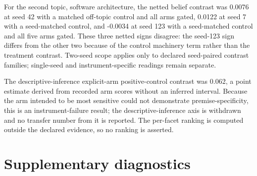 \documentclass[10pt]{article}
\begin{document}
For the second topic, software architecture, the netted belief contrast was 0.0076 at seed 42 with a matched off-topic control and all arms gated, 0.0122 at seed 7 with a seed-matched control, and -0.0034 at seed 123 with a seed-matched control and all five arms gated. These three netted signs disagree: the seed-123 sign differs from the other two because of the control machinery term rather than the treatment contrast. Two-seed scope applies only to declared seed-paired contrast families; single-seed and instrument-specific readings remain separate.



The descriptive-inference explicit-arm positive-control contrast was 0.062, a point estimate derived from recorded arm scores without an inferred interval. Because the arm intended to be most sensitive could not demonstrate premise-specificity, this is an instrument-failure result; the descriptive-inference axis is withdrawn and no transfer number from it is reported. The per-facet ranking is computed outside the declared evidence, so no ranking is asserted.






\appendix
\section{Supplementary diagnostics}
\end{document}
